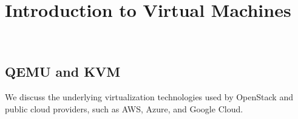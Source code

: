 \chapter{Introduction to Virtual Machines}
\label{c:virtualmachines}

\FILENAME\

\section{QEMU and KVM}
\label{s:motivation-qemu-kvm}

We discuss the underlying virtualization technologies used by OpenStack and
public cloud providers, such as AWS, Azure, and Google Cloud.



